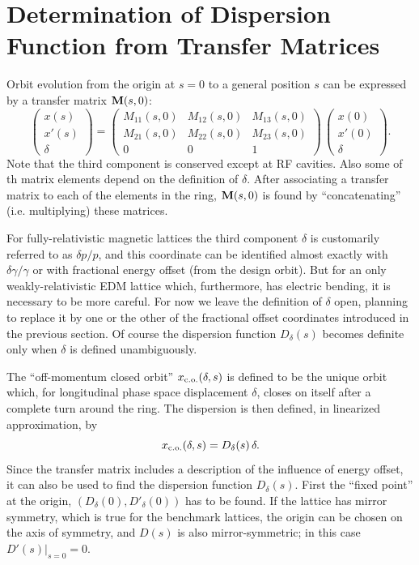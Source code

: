 \documentclass[]{article}
\begin{document}
\section{Determination of Dispersion Function from Transfer Matrices}
Orbit evolution from the origin at $s=0$ to
a general position $s$ can be expressed by
a transfer matrix ${\bf M}(s,0)$:
%
\begin{equation}
\begin{pmatrix}
x(s) \\ x'(s) \\ \delta
\end{pmatrix}
  =
\begin{pmatrix}
  M_{11}(s,0)  &  M_{12}(s,0)  &   M_{13}(s,0) \\
  M_{21}(s,0)  &  M_{22}(s,0)  &   M_{23}(s,0) \\
   0      &    0     &    1       
\end{pmatrix}\,
\begin{pmatrix}
x(0) \\ x'(0) \\ \delta
\end{pmatrix}.
\label{eq:Dispersion.2p} 
\end{equation}
%
Note that the third component is conserved except at RF cavities.
Also some of th matrix elements depend on the definition of $\delta$.
After associating a transfer matrix to each of the elements in the ring, 
${\bf M}(s,0)$ is found by ``concatenating'' (i.e. multiplying) these
matrices.

For fully-relativistic magnetic lattices the third component $\delta$ is customarily
referred to as $\delta p/p$, and this coordinate
can be identified almost exactly with $\delta\gamma/\gamma$ or with fractional
energy offset (from the design orbit). 
But for an only weakly-relativistic EDM lattice which, furthermore, has
electric bending, it is necessary to be more careful. For now we leave
the definition of $\delta$ open, planning to replace it by one or the
other of the fractional offset coordinates introduced in the previous
section. Of course the dispersion function $D_{\delta}(s)$ becomes definite only 
when $\delta$ is defined unambiguously.
 
The ``off-momentum closed orbit'' $x_{\rm c.o.}(\delta,s)$ is defined
to be the unique orbit which, for longitudinal phase space displacement 
$\delta$, closes on itself after a complete turn around the ring.
The dispersion is then defined, in linearized approximation, by
%
\begin{equation}
x_{\rm c.o.}(\delta,s)
 =
D_{\delta}(s)\,\delta.
\label{eq:Dispersion.1}
\end{equation}
%
Since the transfer matrix includes a description of the 
influence of energy offset, it can also be used
to find the dispersion function $D_{\delta}(s)$. First the
``fixed point'' at the origin, 
$(D_{\delta}(0), D'_{\delta}(0))$ has to be found.
If the lattice
has mirror symmetry, which is true for the benchmark lattices, 
the origin can be chosen on the axis of symmetry, and $D(s)$ is 
also mirror-symmetric; in this case $D'(s)|_{s=0}=0$. 
\end{document}
